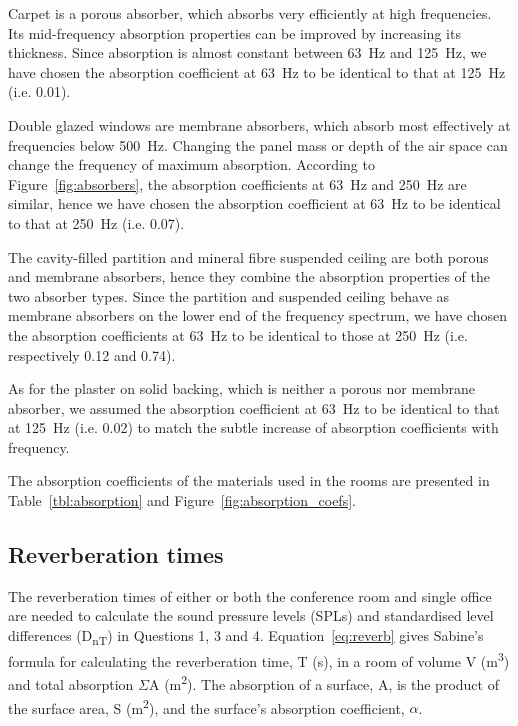 

Carpet is a porous absorber, which absorbs very efficiently at high frequencies.
Its mid-frequency absorption properties can be improved by increasing its thickness.
Since absorption is almost constant between 63~Hz and 125~Hz, we have chosen the absorption coefficient at 63~Hz to be identical to that at 125~Hz (i.e. 0.01).

Double glazed windows are membrane absorbers, which absorb most effectively at frequencies below 500~Hz.
Changing the panel mass or depth of the air space can change the frequency of maximum absorption.
According to Figure~\ref{fig:absorbers}, the absorption coefficients at 63~Hz and 250~Hz are similar, hence we have chosen the absorption coefficient at 63~Hz to be identical to that at 250~Hz (i.e. 0.07).

The cavity-filled partition and mineral fibre suspended ceiling are both porous and membrane absorbers, hence they combine the absorption properties of the two absorber types.
Since the partition and suspended ceiling behave as membrane absorbers on the lower end of the frequency spectrum, we have chosen the absorption coefficients at 63~Hz to be identical to those at 250~Hz (i.e. respectively 0.12 and 0.74).

As for the plaster on solid backing, which is neither a porous nor membrane absorber, we assumed the absorption coefficient at 63~Hz to be identical to that at 125~Hz (i.e. 0.02) to match the subtle increase of absorption coefficients with frequency.

The absorption coefficients of the materials used in the rooms are presented in Table~\ref{tbl:absorption} and Figure~\ref{fig:absorption_coefs}.





\subsection{Reverberation times}

The reverberation times of either or both the conference room and single office are needed to calculate the sound pressure levels (SPLs) and standardised level differences (D\textsubscript{nT}) in Questions 1, 3 and 4.
Equation~\ref{eq:reverb} gives Sabine's formula for calculating the reverberation time, T (s), in a room of volume V (m\textsuperscript{3}) and total absorption $\Sigma$A (m\textsuperscript{2}).
The absorption of a surface, A, is the product of the surface area, S (m\textsuperscript{2}), and the surface's absorption coefficient, $\alpha$.

